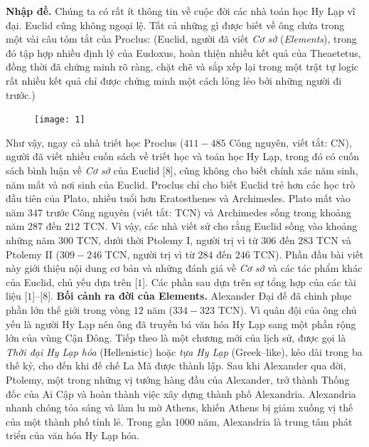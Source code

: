 \begin{multicols}{2}
	\textbf{\color{lichsutoanhoc}Nhập đề.}
	Chúng ta có rất ít thông tin về cuộc đời các nhà toán học Hy Lạp vĩ đại. Euclid cũng không ngoại lệ. Tất cả những gì được biết về ông chứa trong một vài câu tóm tắt của Proclus: (Euclid, người đã viết \textit{Cơ sở} (\textit{Elements}), trong đó tập hợp nhiều định lý của Eudoxus, hoàn thiện nhiều kết quả của Theaetetus, đồng thời đã chứng minh rõ ràng, chặt chẽ và sắp xếp lại trong một trật tự logic rất nhiều kết quả chỉ được chứng minh một cách lỏng lẻo bởi những người đi trước.)
		\begin{figure}[H]
		\vspace*{-5pt}
		\centering
		\captionsetup{labelformat= empty, justification=centering}
		\texttt{[image: 1]}
		\vspace*{-10pt}
	\end{figure}
	Như vậy, ngay cả nhà triết học Proclus ($411-485$ Công nguyên, viết tắt: CN), người đã viết nhiều cuốn sách về triết học và toán học Hy Lạp, trong đó có cuốn sách bình luận về \textit{Cơ sở} của Euclid [$8$], cũng không cho biết chính xác năm sinh, năm mất và nơi sinh của Euclid. Proclus chỉ cho biết Euclid trẻ hơn các học trò đầu tiên của Plato, nhiều tuổi hơn Eratosthenes và Archimedes. Plato mất vào năm $347$ trước Công nguyên (viết tắt: TCN) và Archimedes sống trong khoảng năm $287$ đến $212$ TCN. Vì vậy, các nhà viết sử cho rằng Euclid sống vào khoảng những năm $300$ TCN, dưới thời Ptolemy I, người trị vì từ $306$ đến $283$ TCN và Ptolemy II ($309-246$ TCN, người trị vì từ $284$ đến $246$ TCN). 
	\vskip 0.1cm
	Phần đầu bài viết này giới thiệu nội dung cơ bản và những đánh giá về \textit{Cơ sở} và các tác phẩm khác của Euclid, chủ yếu dựa trên [$1$]. Các phần sau dựa trên sự tổng hợp của các tài liệu [$1$]--[$8$].
	\vskip 0.1cm
	\textbf{\color{lichsutoanhoc}Bối cảnh ra đời của Elements.}
	Alexander Đại đế đã chinh phục phần lớn thế giới trong vòng $12$ năm ($334-323$ TCN). Vì quân đội của ông chủ yếu là người Hy Lạp nên ông đã truyền bá văn hóa Hy Lạp sang một phần rộng lớn của vùng Cận Đông. Tiếp theo là một chương mới của lịch sử, được gọi là \textit{Thời đại Hy Lạp hóa} (Hellenistic) hoặc \textit{tựa Hy Lạp} (Greek--like), kéo dài trong ba thế kỷ, cho đến khi đế chế La Mã được thành lập.
	\vskip 0.1cm
	Sau khi Alexander qua đời, Ptolemy, một trong những vị tướng hàng đầu của Alexander, trở thành Thống đốc của Ai Cập và hoàn thành việc xây dựng thành phố Alexandria. Alexandria nhanh chóng tỏa sáng và làm lu mờ Athens, khiến Athens bị giảm xuống vị thế của một thành phố tỉnh lẻ. Trong gần $1000$ năm, Alexandria là trung tâm phát triển của văn hóa Hy Lạp hóa.

\end{multicols}
